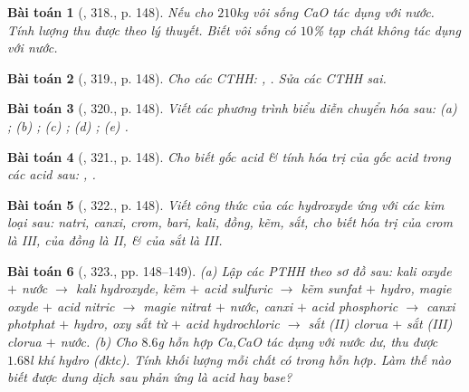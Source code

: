 \documentclass{article}
\newtheorem{baitoan}{Bài toán}
\begin{document}
\begin{baitoan}[\cite{An_400_BT_Hoa_Hoc_8_2020}, 318., p. 148]
	Nếu cho $210$\emph{kg} vôi sống \emph{CaO} tác dụng với nước. Tính lượng \emph{} thu được theo lý thuyết. Biết vôi sống có $10$\% tạp chát không tác dụng với nước.
\end{baitoan}

\begin{baitoan}[\cite{An_400_BT_Hoa_Hoc_8_2020}, 319., p. 148]
	Cho các CTHH: \emph{, }. Sửa các CTHH sai.
\end{baitoan}

\begin{baitoan}[\cite{An_400_BT_Hoa_Hoc_8_2020}, 320., p. 148]
	Viết các phương trình biểu diễn chuyển hóa sau: (a) \emph{}; (b) \emph{}; (c) \emph{}; (d) \emph{}; (e) \emph{}.
\end{baitoan}

\begin{baitoan}[\cite{An_400_BT_Hoa_Hoc_8_2020}, 321., p. 148]
	Cho biết gốc acid \& tính hóa trị của gốc acid trong các acid sau: \emph{, }.
\end{baitoan}

\begin{baitoan}[\cite{An_400_BT_Hoa_Hoc_8_2020}, 322., p. 148]
	Viết công thức của các hydroxyde ứng với các kim loại sau: natri, canxi, crom, bari, kali, đồng, kẽm, sắt, cho biết hóa trị của crom là III, của đồng là II, \& của sắt là III.
\end{baitoan}

\begin{baitoan}[\cite{An_400_BT_Hoa_Hoc_8_2020}, 323., pp. 148--149]
	(a) Lập các PTHH theo sơ đồ sau: kali oxyde $+$ nước $\to$ kali hydroxyde, kẽm $+$ acid sulfuric $\to$ kẽm sunfat $+$ hydro, magie oxyde $+$ acid nitric $\to$ magie nitrat $+$ nước, canxi $+$ acid phosphoric $\to$ canxi photphat $+$ hydro, oxy sắt từ \emph{} $+$ acid hydrochloric $\to$ sắt (II) clorua $+$ sắt (III) clorua $+$ nước. (b) Cho $8.6$\emph{g} hỗn hợp \emph{Ca,CaO} tác dụng với nước dư, thu được $1.68$\emph{l} khí hydro (đktc). Tính khối lượng mỗi chất có trong hỗn hợp. Làm thế nào biết được dung dịch sau phản ứng là acid hay base?
\end{baitoan}
\end{document}
